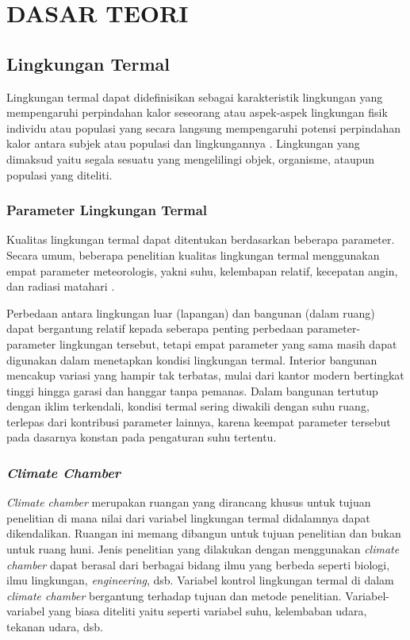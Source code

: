 \chapter{DASAR TEORI}
\label{dasar-teori}

\section{Lingkungan Termal}

Lingkungan termal dapat didefinisikan sebagai karakteristik lingkungan yang mempengaruhi perpindahan kalor seseorang \cite{ASHRAE55} atau aspek-aspek lingkungan fisik individu atau populasi yang secara langsung mempengaruhi potensi perpindahan kalor antara subjek atau populasi dan lingkungannya \cite{book1}. Lingkungan yang dimaksud yaitu segala sesuatu yang mengelilingi objek, organisme, ataupun populasi yang diteliti.

\subsection{Parameter Lingkungan Termal}

Kualitas lingkungan termal dapat ditentukan berdasarkan beberapa parameter. Secara umum, beberapa penelitian kualitas lingkungan termal menggunakan empat parameter meteorologis, yakni suhu, kelembapan relatif, kecepatan angin, dan radiasi matahari \cite{book1}.

Perbedaan antara lingkungan luar (lapangan) dan bangunan (dalam ruang) dapat bergantung relatif kepada seberapa penting perbedaan parameter-parameter lingkungan tersebut, tetapi empat parameter yang sama masih dapat digunakan dalam menetapkan kondisi lingkungan termal. Interior bangunan mencakup variasi yang hampir tak terbatas, mulai dari kantor modern bertingkat tinggi hingga garasi dan hanggar tanpa pemanas. Dalam bangunan tertutup dengan iklim terkendali, kondisi termal sering diwakili dengan suhu ruang, terlepas dari kontribusi parameter lainnya, karena keempat parameter tersebut pada dasarnya konstan pada pengaturan suhu tertentu.

\subsection{\textit{Climate Chamber}}

\textit{Climate chamber} merupakan ruangan yang dirancang khusus untuk tujuan penelitian di mana nilai dari variabel lingkungan termal didalamnya dapat dikendalikan. Ruangan ini memang dibangun untuk tujuan penelitian dan bukan untuk ruang huni. Jenis penelitian yang dilakukan dengan menggunakan \textit{climate chamber} dapat berasal dari berbagai bidang ilmu yang berbeda seperti biologi, ilmu lingkungan, \textit{engineering}, dsb. Variabel kontrol lingkungan termal di dalam \textit{climate chamber} bergantung terhadap tujuan dan metode penelitian. Variabel-variabel yang biasa diteliti yaitu seperti variabel suhu, kelembaban udara, tekanan udara, dsb.

